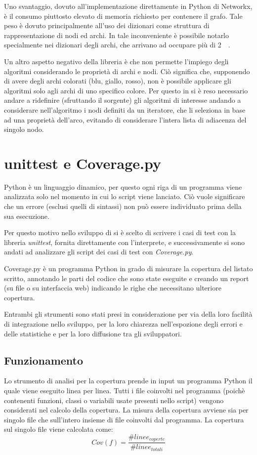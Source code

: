 Uno svantaggio, dovuto all'implementazione direttamente in Python di
Networkx, è il consumo piuttosto elevato di memoria richiesto
per contenere il grafo. Tale peso è dovuto principalmente
all'uso dei dizionari come struttura di rappresentazione di nodi ed
archi. In \pygfa tale inconveniente è possibile notarlo specialmente
nei dizionari degli archi, che arrivano ad occupare più
di \SI{2}{\kilo\byte}.

Un altro aspetto negativo della libreria è che non permette l'impiego degli
algoritmi considerando le proprietà di archi e nodi. Ciò significa
che, supponendo di avere degli archi colorati (blu, giallo, rosso),
non è possibile applicare gli algoritmi solo agli archi di uno specifico
colore. Per questo in \pygfa si è reso necessario andare a ridefinire
(sfruttando il sorgente) gli algoritmi di interesse andando
a considerare nell'algoritmo i nodi definiti da un iteratore, che li
seleziona in base ad una proprietà dell'arco, evitando
di considerare l'intera lista di adiacenza del singolo nodo.

\section{unittest e Coverage.py}
Python è un linguaggio dinamico, per questo ogni
riga di un programma viene analizzata solo nel momento
in cui lo script viene lanciato. Ciò vuole significare che un errore
(esclusi quelli di sintassi) non può essere individuato prima
della sua esecuzione.

Per questo motivo nello sviluppo di \pygfa si è scelto di scrivere
i casi di test con la libreria \emph{unittest}, fornita direttamente
con l'interprete, e successivamente si sono andati ad analizzare
gli script dei casi di test con \emph{Coverage.py}.

Coverage.py è un programma Python in grado di misurare la
copertura del listato scritto, annotando le parti del codice che
sono state eseguite e creando un report (su file o su interfaccia web)
indicando le righe che necessitano ulteriore copertura.

Entrambi gli strumenti sono stati presi in considerazione per via
della loro facilità di integrazione nello sviluppo, per
la loro chiarezza nell'espozione degli errori e delle statistiche
e per la loro diffusione tra gli sviluppatori.

\subsection{Funzionamento}
Lo strumento di analisi per la copertura prende in input un programma Python il quale
viene eseguito linea per linea. Tutti i file coinvolti nel programma
(poichè contenenti funzioni, classi o variabili usate presenti
nello script) vengono considerati nel calcolo della copertura. La
misura della copertura avviene sia per singolo file che sull'intero
insieme di file coinvolti dal programma. La copertura
sul singolo file viene calcolata come:
\begin{equation}
Cov(f) = \frac{\#linee_{coperte}}{\#linee_{totali}}
\end{equation}

